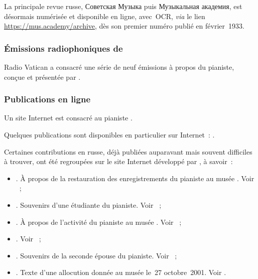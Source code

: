 La principale revue russe, \foreignlanguage{russian}{Советская Музыка} puis
\foreignlanguage{russian}{Музыкальная академия}, est désormais numérisée et
disponible en ligne, avec~OCR, \emph{via} le lien
\href{https://mus.academy/archive}{https://mus.academy/archive}, dès son
premier numéro publié en février~1933.

\subsubsection{Émissions radiophoniques de \citeauthor{Voskobojnikov08}}

Radio Vatican a consacré une série de neuf émissions à propos du pianiste,
conçue et présentée par \VVoskobojnikov{} \citep[voir][]{Voskobojnikov08}.

\subsubsection{Publications en ligne}

Un site Internet est consacré au pianiste \citep[voir][]{Sofronitsky09}.

Quelques publications sont disponibles en particulier sur Internet~:
\citet{Avdeeva, Bykova20, Fedorovich, HLG, Lazarev20, Letourneur, Oron,
Sofronitsky10, Summers, Vitsinsky}.

Certaines contributions en russe, déjà publiées auparavant mais souvent
difficiles à trouver, ont été regroupées sur le site Internet développé par
\citet{Badeyan10a}, à savoir~:
\begin{itemize}
 \item\citet{Badeyan10b}.
 À propos de la restauration des enregistrements du pianiste au musée
 \Scriabine{}.
 Voir \citet{Badeyan02, Badeyan03, Badeyan03b, Badeyan08}~;
 \item\citet{Lebedeva}.
 Souvenirs d'une étudiante du pianiste.
 Voir \citet{Lebedeva03}~;
 \item\citet{Nikonovich10}.
 À propos de l'activité du pianiste au musée \Scriabine{}.
 Voir \citet{Nikonovich03}~;
 \item\citet{Petropavlov}.
 Voir \citet{Petropavlov03}~;
 \item\citet{Sofronitskaya10}.
 Souvenirs de la seconde épouse du pianiste.
 Voir \citet{Sofronitskaya03}~;
 \item\citet{Zolotov10}.
 Texte d'une allocution donnée au musée \Scriabine{} le~27 octobre~2001.
 Voir \citet{Zolotov03a}.
\end{itemize}

